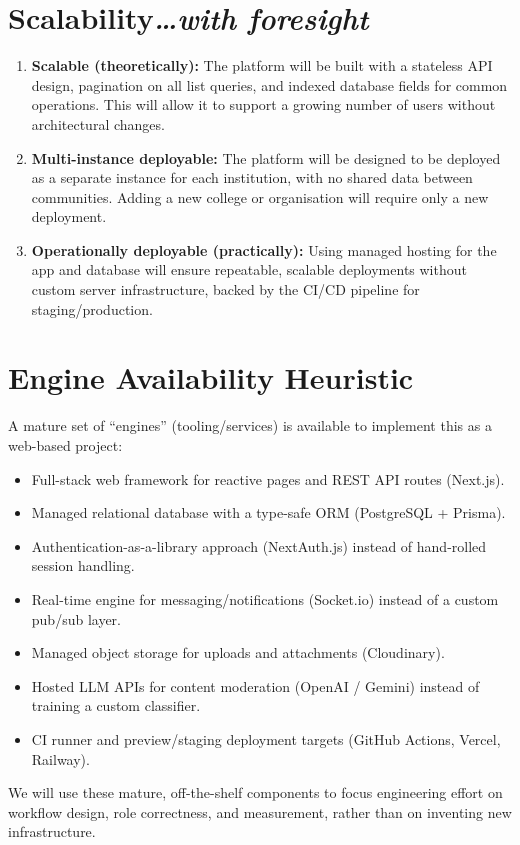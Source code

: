 \documentclass[11pt,a4paper]{article}
\newcommand{\BvrHint}[1]{{\normalfont\normalsize\itshape\hfill #1}}
\begin{document}
\section{Scalability\BvrHint{\ldots with foresight}}

\begin{enumerate}[leftmargin=0.7cm]
    \item \textbf{Scalable (theoretically):} The platform will be built with a stateless API design, pagination on all list queries, and indexed database fields for common operations. This will allow it to support a growing number of users without architectural changes.
    \item \textbf{Multi-instance deployable:} The platform will be designed to be deployed as a separate instance for each institution, with no shared data between communities. Adding a new college or organisation will require only a new deployment.
    \item \textbf{Operationally deployable (practically):} Using managed hosting for the app and database will ensure repeatable, scalable deployments without custom server infrastructure, backed by the CI/CD pipeline for staging/production.
\end{enumerate}

\section{Engine Availability Heuristic}

A mature set of ``engines'' (tooling/services) is available to implement this as a web-based project:
\begin{itemize}[leftmargin=0.7cm]
    \item Full-stack web framework for reactive pages and REST API routes (Next.js).
    \item Managed relational database with a type-safe ORM (PostgreSQL + Prisma).
    \item Authentication-as-a-library approach (NextAuth.js) instead of hand-rolled session handling.
    \item Real-time engine for messaging/notifications (Socket.io) instead of a custom pub/sub layer.
    \item Managed object storage for uploads and attachments (Cloudinary).
    \item Hosted LLM APIs for content moderation (OpenAI / Gemini) instead of training a custom classifier.
    \item CI runner and preview/staging deployment targets (GitHub Actions, Vercel, Railway).
\end{itemize}
We will use these mature, off-the-shelf components to focus engineering effort on workflow design, role correctness, and measurement, rather than on inventing new infrastructure.
\end{document}
